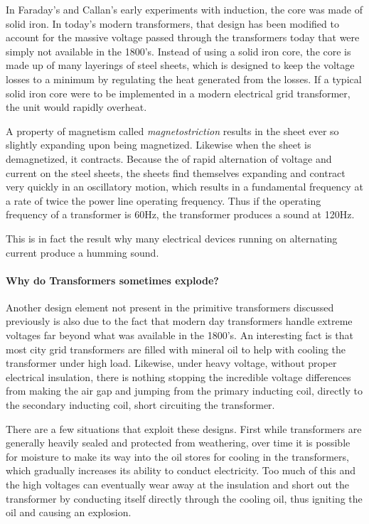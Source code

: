 \documentclass[12pt]{article}
\begin{document}
In Faraday's and Callan's early experiments with induction, the core was made of solid iron. In today's modern transformers, that design has been modified to account for the massive voltage passed through the transformers today that were simply not available in the 1800's. Instead of using a solid iron core, the core is made up of many layerings of steel sheets, which is designed to keep the voltage losses to a minimum by regulating the heat generated from the losses. If a typical solid iron core were to be implemented in a modern electrical grid transformer, the unit would rapidly overheat. 

A property of magnetism called \textit{magnetostriction} results in the sheet ever so slightly expanding upon being magnetized. Likewise when the sheet is demagnetized, it contracts. Because the of rapid alternation of voltage and current on the steel sheets, the sheets find themselves expanding and contract very quickly in an oscillatory motion, which results in a fundamental frequency at a rate of twice the power line operating frequency. Thus if the operating frequency of a transformer is 60Hz, the transformer produces a sound at 120Hz. 

This is in fact the result why many electrical devices running on alternating current produce a humming sound.


\paragraph{Why do Transformers sometimes explode?} Another design element not present in the primitive transformers discussed previously is also due to the fact that modern day transformers handle extreme voltages far beyond what was available in the 1800's. An interesting fact is that most city grid transformers are filled with mineral oil to help with cooling the transformer under high load. Likewise, under heavy voltage, without proper electrical insulation, there is nothing stopping the incredible voltage differences from making the air gap and jumping from the primary inducting coil, directly to the secondary inducting coil, short circuiting the transformer. 

There are a few situations that exploit these designs. First while transformers are generally heavily sealed and protected from weathering, over time it is possible for moisture to make its way into the oil stores for cooling in the transformers, which gradually increases its ability to conduct electricity. Too much of this and the high voltages can eventually wear away at the insulation and short out the transformer by conducting itself directly through the cooling oil, thus igniting the oil and causing an explosion.
\end{document}
